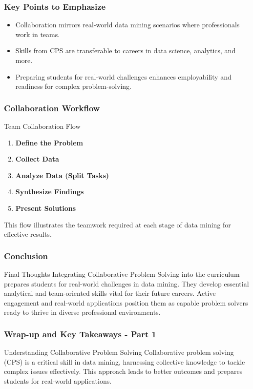 \documentclass{beamer}
\begin{document}
\begin{frame}[fragile]
    \frametitle{Key Points to Emphasize}
    \begin{itemize}
        \item Collaboration mirrors real-world data mining scenarios where professionals work in teams.
        \item Skills from CPS are transferable to careers in data science, analytics, and more.
        \item Preparing students for real-world challenges enhances employability and readiness for complex problem-solving.
    \end{itemize}
\end{frame}

\begin{frame}[fragile]
    \frametitle{Collaboration Workflow}
    \begin{block}{Team Collaboration Flow}
        \begin{enumerate}
            \item \textbf{Define the Problem}
            \item \textbf{Collect Data}
            \item \textbf{Analyze Data (Split Tasks)}
            \item \textbf{Synthesize Findings}
            \item \textbf{Present Solutions}
        \end{enumerate}
        This flow illustrates the teamwork required at each stage of data mining for effective results.
    \end{block}
\end{frame}

\begin{frame}[fragile]
    \frametitle{Conclusion}
    \begin{block}{Final Thoughts}
        Integrating Collaborative Problem Solving into the curriculum prepares students for real-world challenges in data mining.
        They develop essential analytical and team-oriented skills vital for their future careers.
        Active engagement and real-world applications position them as capable problem solvers ready to thrive in diverse professional environments.
    \end{block}
\end{frame}

\begin{frame}[fragile]
    \frametitle{Wrap-up and Key Takeaways - Part 1}
    \begin{block}{Understanding Collaborative Problem Solving}
        Collaborative problem solving (CPS) is a critical skill in data mining, 
        harnessing collective knowledge to tackle complex issues effectively. 
        This approach leads to better outcomes and prepares students for real-world applications.
    \end{block}
\end{frame}
\end{document}
